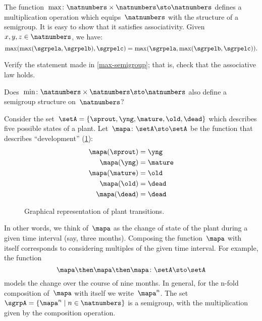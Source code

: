 \begin{example}
  \label{max-semigroup}
  The function~$\max \colon \natnumbers \times \natnumbers \sto \natnumbers$ defines a multiplication operation which equips~$\natnumbers$ with the structure of a semigroup.
  It is easy to show that it satisfies associativity. Given~$x,y,z\in \natnumbers$, we have:
  \begin{equation*}
    \label{eq:max-assoc}
    \max(\max(\sgrpela,\sgrpelb),\sgrpelc)=\max(\sgrpela,\max(\sgrpelb,\sgrpelc)).
  \end{equation*}
\end{example}

\begin{exercise}
  \label{ex:max-semigroup}
  Verify the statement made in \cref{max-semigroup}; that is, check that the associative law holds.

  Does~$\min \colon \natnumbers \times \natnumbers \sto \natnumbers$ also define a semigroup structure on~$\natnumbers$?
\end{exercise}
\begin{solution}
\end{solution}

\begin{example}
  \label{plant-trafo-semigroup}
  Consider the set~$\setA = \{ \sprout, \yng, \mature, \old, \dead \}$ which describes five possible states of a plant. Let~$\mapa \colon \setA \sto \setA$ be the function that describes ``development'' (\cref{fig:plants_transitions}):
  \begin{align*}
    \mapa(\sprout) &=  \yng \\
    \mapa(\yng) &=  \mature \\
    \mapa(\mature) &=  \old \\
    \mapa( \old) &= \dead \\
    \mapa (\dead) &= \dead
  \end{align*}
  \begin{figure}[h]
    \caption{Graphical representation of plant transitions.}
    \label{fig:plants_transitions}
\end{figure}
  In other words, we think of~$\mapa$ as the change of state of the plant during a given time interval (say, three months).
  Composing the function~$\mapa$ with itself corresponds to considering multiples of the given time interval.
  For example, the function
  \begin{equation*}
    \mapa \then \mapa \then \mapa \colon \setA \sto \setA
  \end{equation*}
  models the change over the course of nine months.
  In general, for the n-fold composition of~$\mapa$ with itself we write~$\mapa^n$.
  The set~$\sgrpA = \{ \mapa^n \mid n \in \natnumbers \}$ is a semigroup, with the multiplication given by the composition operation.
\end{example}

